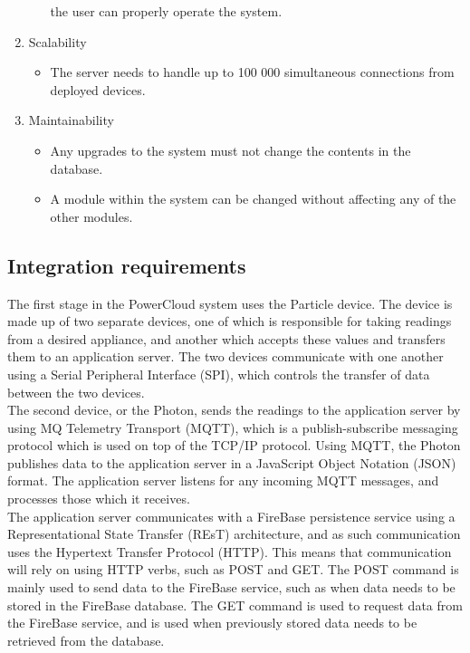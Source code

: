 \documentclass{article}
\begin{document}
\begin{enumerate}
\begin{itemize}
				the user can properly operate the system.
			\end{itemize}
		\item Scalability
			\begin{itemize}
				\item The server needs to handle up to 100 000 
				simultaneous connections from deployed devices.
			\end{itemize}
		\item Maintainability
			\begin{itemize}
				\item Any upgrades to the system must not change the 
				contents in the database.
				\item A module within the system can be changed without 
				affecting any of the other modules.
			\end{itemize}
	\end{enumerate}
	
	\newpage
	
	\subsection{Integration requirements}
	
	The first stage in the PowerCloud system uses the Particle device. 
	The device is made up of two separate devices, one of which is 
	responsible for taking readings from a desired appliance, and another 
	which accepts these values and transfers them to an application 
	server. The two devices communicate with one another using a Serial 
	Peripheral Interface (SPI), which controls the transfer of data 
	between the two devices.\\
	
	The second device, or the Photon, sends the readings to the 
	application server by using MQ Telemetry Transport (MQTT), which is a 
	publish-subscribe messaging protocol which is used on top of the 
	TCP/IP protocol. Using MQTT, the Photon publishes data to the 
	application server in a JavaScript Object Notation (JSON) format. The 
	application server listens for any incoming MQTT messages, and 
	processes those which it receives.\\
	
	The application server communicates with a FireBase persistence 
	service using a Representational State Transfer (REsT) architecture, 
	and as such communication uses the Hypertext Transfer Protocol 
	(HTTP). This means that communication will rely on using HTTP verbs, 
	such as POST and GET. The POST command is mainly used to send data to 
	the FireBase service, such as when data needs to be stored in the 
	FireBase database. The GET command is used to request data from the 
	FireBase service, and is used when previously stored data needs to be 
	retrieved from the database.\\
	
\end{document}
